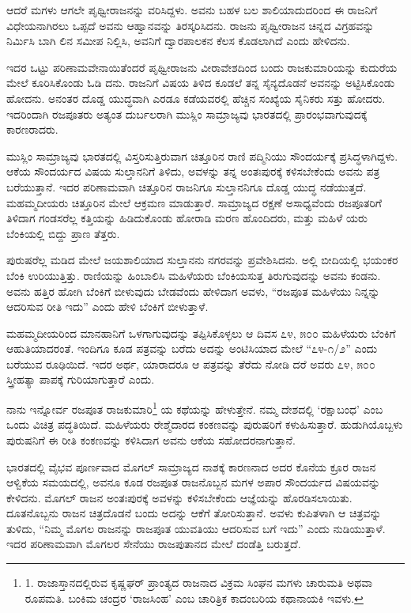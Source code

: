 ಆದರೆ ಮಗಳು ಆಗಲೇ ಪೃಥ್ವೀರಾಜನನ್ನು ವರಿಸಿದ್ದಳು. ಅವನು ಬಹಳ ಬಲ ಶಾಲಿಯಾದುದರಿಂದ ಈ ರಾಜನಿಗೆ ವಿಧೇಯನಾಗಿರಲು ಒಪ್ಪದೆ ಅವನು ಆಹ್ವಾನವನ್ನು ತಿರಸ್ಕರಿಸಿದನು. ರಾಜನು ಪೃಥ್ವೀರಾಜನ ಚಿನ್ನದ ವಿಗ್ರಹವನ್ನು ನಿರ್ಮಿಸಿ ಬಾಗಿ ಲಿನ ಸಮೀಪ ನಿಲ್ಲಿಸಿ, ಅವನಿಗೆ ದ್ವಾರಪಾಲಕನ ಕೆಲಸ ಕೊಡಲಾಗಿದೆ ಎಂದು ಹೇಳಿದನು.

ಇದರ ಒಟ್ಟು ಪರಿಣಾಮವೇನಾಯಿತೆಂದರೆ ಪೃಥ್ವೀರಾಜನು ವೀರಾವೇಶದಿಂದ ಬಂದು ರಾಜಕುಮಾರಿಯನ್ನು ಕುದುರೆಯ ಮೇಲೆ ಕೂರಿಸಿಕೊಂಡು ಓಡಿ ದನು. ರಾಜನಿಗೆ ವಿಷಯ ತಿಳಿದ ಕೂಡಲೆ ತನ್ನ ಸೈನ್ಯದೊಡನೆ ಅವನನ್ನು ಅಟ್ಟಿಸಿಕೊಂಡು ಹೋದನು. ಅನಂತರ ದೊಡ್ಡ ಯುದ್ಧವಾಗಿ ಎರಡೂ ಕಡೆಯವರಲ್ಲಿ ಹೆಚ್ಚಿನ ಸಂಖ್ಯೆಯ ಸೈನಿಕರು ಸತ್ತು ಹೋದರು. ಇದರಿಂದಾಗಿ ರಜಪೂತರು ಅತ್ಯಂತ ದುರ್ಬಲರಾಗಿ ಮುಸ್ಲಿಂ ಸಾಮ್ರಾಜ್ಯವು ಭಾರತದಲ್ಲಿ ಪ್ರಾರಂಭವಾಗುವುದಕ್ಕೆ ಕಾರಣರಾದರು.

ಮುಸ್ಲಿಂ ಸಾಮ್ರಾಜ್ಯವು ಭಾರತದಲ್ಲಿ ವಿಸ್ತರಿಸುತ್ತಿರುವಾಗ ಚಿತ್ತೂರಿನ ರಾಣಿ ಪದ್ಮಿನಿಯು ಸೌಂದರ್ಯಕ್ಕೆ ಪ್ರಸಿದ್ಧಳಾಗಿದ್ದಳು. ಆಕೆಯ ಸೌಂದರ್ಯದ ವಿಷಯ ಸುಲ್ತಾನನಿಗೆ ತಿಳಿದು, ಅವಳನ್ನು ತನ್ನ ಅಂತಃಪುರಕ್ಕೆ ಕಳಿಸಬೇಕೆಂದು ಅವನು ಪತ್ರ ಬರೆಯುತ್ತಾನೆ. ಇದರ ಪರಿಣಾಮವಾಗಿ ಚಿತ್ತೂರಿನ ರಾಜನಿಗೂ ಸುಲ್ತಾನನಿಗೂ ದೊಡ್ಡ ಯುದ್ಧ ನಡೆಯುತ್ತದೆ. ಮಹಮ್ಮದೀಯರು ಚಿತ್ತೂರಿನ ಮೇಲೆ ಆಕ್ರಮಣ ಮಾಡುತ್ತಾರೆ. ಸಾಮ್ರಾಜ್ಯದ ರಕ್ಷಣೆ ಅಸಾಧ್ಯವೆಂದು ರಜಪೂತರಿಗೆ ತಿಳಿದಾಗ ಗಂಡಸರೆಲ್ಲ ಕತ್ತಿಯನ್ನು ಹಿಡಿದುಕೊಂಡು ಹೋರಾಡಿ ಮರಣ ಹೊಂದಿದರು, ಮತ್ತು ಮಹಿಳೆ ಯರು ಬೆಂಕಿಯಲ್ಲಿ ಬಿದ್ದು ಪ್ರಾಣ ತೆತ್ತರು.

ಪುರುಷರೆಲ್ಲ ಮಡಿದ ಮೇಲೆ ಜಯಶಾಲಿಯಾದ ಸುಲ್ತಾನನು ನಗರವನ್ನು ಪ್ರವೇಶಿಸಿದನು. ಅಲ್ಲಿ ಬೀದಿಯಲ್ಲಿ ಭಯಂಕರ ಬೆಂಕಿ ಉರಿಯುತ್ತಿತ್ತು. ರಾಣಿಯನ್ನು ಹಿಂಬಾಲಿಸಿ ಮಹಿಳೆಯರು ಬೆಂಕಿಯಸುತ್ತ ತಿರುಗುವುದನ್ನು ಅವನು ಕಂಡನು. ಅವನು ಹತ್ತಿರ ಹೋಗಿ ಬೆಂಕಿಗೆ ಬೀಳುವುದು ಬೇಡವೆಂದು ಹೇಳಿದಾಗ ಅವಳು, “ರಜಪೂತ ಮಹಿಳೆಯು ನಿನ್ನನ್ನು ಆದರಿಸುವ ರೀತಿ ಇದು” ಎಂದು ಹೇಳಿ ಬೆಂಕಿಗೆ ಬೀಳುತ್ತಾಳೆ.

ಮಹಮ್ಮದೀಯರಿಂದ ಮಾನಹಾನಿಗೆ ಒಳಗಾಗುವುದನ್ನು ತಪ್ಪಿಸಿಕೊಳ್ಳಲು ಆ ದಿವಸ ೭೪, ೫೦೦ ಮಹಿಳೆಯರು ಬೆಂಕಿಗೆ ಆಹುತಿಯಾದರಂತೆ. ಇಂದಿಗೂ ಕೂಡ ಪತ್ರವನ್ನು ಬರೆದು ಅದನ್ನು ಅಂಟಿಸಿಯಾದ ಮೇಲೆ “೭೪-೧/೨” ಎಂದು ಬರೆಯುವ ರೂಢಿಯಿದೆ. ಇದರ ಅರ್ಥ, ಯಾರಾದರೂ ಆ ಪತ್ರವನ್ನು ತೆರೆದು ನೋಡಿ ದರೆ ಅವರು ೭೪, ೫೦೦ ಸ್ತ್ರೀಹತ್ಯಾ ಪಾಪಕ್ಕೆ ಗುರಿಯಾಗುತ್ತಾರೆ ಎಂದು.

ನಾನು ಇನ್ನೋರ್ವ ರಜಪೂತ ರಾಜಕುಮಾರಿ\footnote{1. ರಾಜಾಸ್ತಾನದಲ್ಲಿರುವ ಕೃಷ್ಣಘರ್ ಪ್ರಾಂತ್ಯದ ರಾಜನಾದ ವಿಕ್ರಮ ಸಿಂಘನ ಮಗಳು ಚಾರುಮತಿ ಅಥವಾ ರೂಪಮತಿ. ಬಂಕಿಮ ಚಂದ್ರರ ‘ರಾಜಸಿಂಹ’ ಎಂಬ ಚಾರಿತ್ರಿಕ ಕಾದಂಬರಿಯ ಕಥಾನಾಯಕಿ ಇವಳು.} ಯ ಕಥೆಯನ್ನು ಹೇಳುತ್ತೇನೆ. ನಮ್ಮ ದೇಶದಲ್ಲಿ ‘ರಕ್ಷಾಬಂಧ’ ಎಂಬ ಒಂದು ವಿಚಿತ್ರ ಪದ್ಧತಿಯಿದೆ. ಮಹಿಳೆಯರು ರೇಶ್ಮೆದಾರದ ಕಂಕಣವನ್ನು ಪುರುಷರಿಗೆ ಕಳುಹಿಸುತ್ತಾರೆ. ಹುಡುಗಿಯೊಬ್ಬಳು ಪುರುಷನಿಗೆ ಈ ರೀತಿ ಕಂಕಣವನ್ನು ಕಳಿಸಿದಾಗ ಅವನು ಆಕೆಯ ಸಹೋದರನಾಗುತ್ತಾನೆ.

ಭಾರತದಲ್ಲಿ ವೈಭವ ಪೂರ್ಣವಾದ ಮೊಗಲ್ ಸಾಮ್ರಾಜ್ಯದ ನಾಶಕ್ಕೆ ಕಾರಣನಾದ ಅದರ ಕೊನೆಯ ಕ್ರೂರ ರಾಜನ ಆಳ್ವಿಕೆಯ ಸಮಯದಲ್ಲಿ, ಅವನೂ ಕೂಡ ರಜಪೂತ ರಾಜನೊಬ್ಬನ ಮಗಳ ಅಪಾರ ಸೌಂದರ್ಯದ ವಿಷಯವನ್ನು ಕೇಳಿದನು. ಮೊಗಲ್ ರಾಜನ ಅಂತಃಪುರಕ್ಕೆ ಅವಳನ್ನು ಕಳಿಸಬೇಕೆಂದು ಆಜ್ಞೆಯನ್ನು ಹೊರಡಿಸಲಾಯಿತು. ದೂತನೊಬ್ಬನು ರಾಜನ ಚಿತ್ರದೊಡನೆ ಬಂದು ಅದನ್ನು ಆಕೆಗೆ ತೋರಿಸುತ್ತಾನೆ. ಅವಳು ಕುಪಿತಳಾಗಿ ಆ ಚಿತ್ರವನ್ನು ತುಳಿದು, “ನಿಮ್ಮ ಮೊಗಲ ರಾಜನನ್ನು ರಾಜಪೂತ ಯುವತಿಯು ಆದರಿಸುವ ಬಗೆ ಇದು” ಎಂದು ನುಡಿಯುತ್ತಾಳೆ. ಇದರ ಪರಿಣಾಮವಾಗಿ ಮೊಗಲರ ಸೇನೆಯು ರಾಜಪುತಾನದ ಮೇಲೆ ದಂಡೆತ್ತಿ ಬರುತ್ತದೆ.

